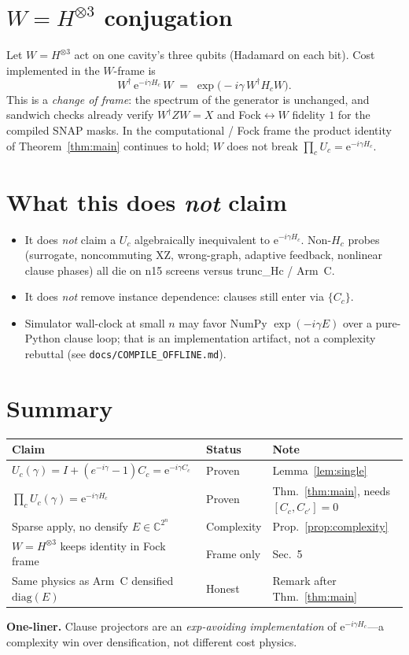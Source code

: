 \documentclass[11pt]{article}
\theoremstyle{definition}
\begin{document}
\section{$W=H^{\otimes 3}$ conjugation}

Let $W=H^{\otimes 3}$ act on one cavity's three qubits (Hadamard on each
bit).  Cost implemented in the $W$-frame is
\begin{equation}
  W^\dagger\,\mathrm{e}^{-i\gamma H_c}\,W
  \;=\;
  \exp\!\bigl(-i\gamma\, W^\dagger H_c W\bigr).
\end{equation}
This is a \emph{change of frame}: the spectrum of the generator is
unchanged, and sandwich checks already verify
$W^\dagger Z W=X$ and Fock$\leftrightarrow W$ fidelity $1$ for the
compiled SNAP masks.  In the computational / Fock frame the product
identity of Theorem~\ref{thm:main} continues to hold; $W$ does not
break $\prod_c U_c=\mathrm{e}^{-i\gamma H_c}$.

\section{What this does \emph{not} claim}

\begin{itemize}[leftmargin=*]
  \item It does \emph{not} claim a $U_c$ algebraically inequivalent to
        $\mathrm{e}^{-i\gamma H_c}$.  Non-$H_c$ probes (surrogate,
        noncommuting XZ, wrong-graph, adaptive feedback, nonlinear
        clause phases) all die on n15 screens versus trunc\_Hc /
        Arm~C.
  \item It does \emph{not} remove instance dependence: clauses still
        enter via $\{C_c\}$.
  \item Simulator wall-clock at small $n$ may favor NumPy
        $\exp(-i\gamma E)$ over a pure-Python clause loop; that is an
        implementation artifact, not a complexity rebuttal
        (see \texttt{docs/COMPILE\_OFFLINE.md}).
\end{itemize}

\section{Summary}

\begin{center}
\begin{tabular}{@{}llp{}@{}}
\toprule
Claim & Status & Note \\
\midrule
$U_c(\gamma)=I+(e^{-i\gamma}-1)C_c=\mathrm{e}^{-i\gamma C_c}$
  & Proven & Lemma~\ref{lem:single} \\
$\prod_c U_c(\gamma)=\mathrm{e}^{-i\gamma H_c}$
  & Proven & Thm.~\ref{thm:main}, needs $[C_c,C_{c'}]=0$ \\
Sparse apply, no densify $E\in\mathbb{C}^{2^n}$
  & Complexity & Prop.~\ref{prop:complexity} \\
$W=H^{\otimes 3}$ keeps identity in Fock frame
  & Frame only & Sec.~5 \\
Same physics as Arm~C densified $\mathrm{diag}(E)$
  & Honest & Remark after Thm.~\ref{thm:main} \\
\bottomrule
\end{tabular}
\end{center}

\vspace{0.8em}
\noindent\textbf{One-liner.}
Clause projectors are an \emph{exp-avoiding implementation} of
$\mathrm{e}^{-i\gamma H_c}$---a complexity win over densification, not
different cost physics.
\end{document}
